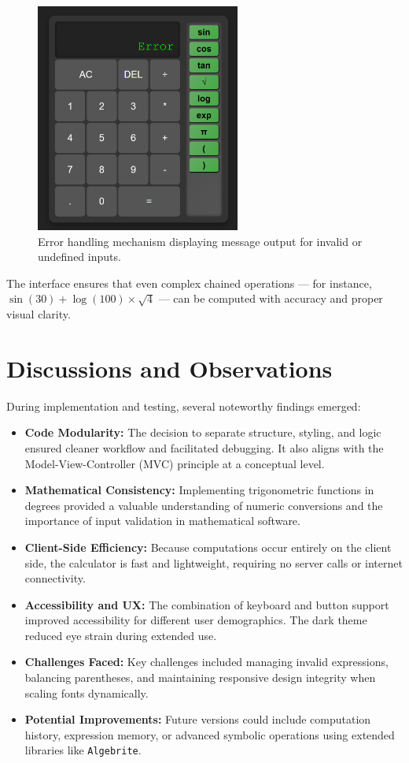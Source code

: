 \documentclass[a4paper,12pt,oneside]{report}
\numberwithin{equation}{chapter}
\numberwithin{figure}{chapter}
\numberwithin{table}{chapter}
\begin{document}
\begin{figure}[H]
    \centering
    \includegraphics[width=0.6\textwidth]{error_calc.png}
    \caption{Error handling mechanism displaying message output for invalid or undefined inputs.}
    \label{fig:CalculatorError}
\end{figure}

The interface ensures that even complex chained operations — for instance, $\sin(30) + \log(100) \times \sqrt{4}$ — can be computed with accuracy and proper visual clarity.

\section{Discussions and Observations}

During implementation and testing, several noteworthy findings emerged:
\begin{itemize}
    \item \textbf{Code Modularity:} The decision to separate structure, styling, and logic ensured cleaner workflow and facilitated debugging. It also aligns with the Model-View-Controller (MVC) principle at a conceptual level.
    \item \textbf{Mathematical Consistency:} Implementing trigonometric functions in degrees provided a valuable understanding of numeric conversions and the importance of input validation in mathematical software.
    \item \textbf{Client-Side Efficiency:} Because computations occur entirely on the client side, the calculator is fast and lightweight, requiring no server calls or internet connectivity.
    \item \textbf{Accessibility and UX:} The combination of keyboard and button support improved accessibility for different user demographics. The dark theme reduced eye strain during extended use.
    \item \textbf{Challenges Faced:} Key challenges included managing invalid expressions, balancing parentheses, and maintaining responsive design integrity when scaling fonts dynamically.
    \item \textbf{Potential Improvements:} Future versions could include computation history, expression memory, or advanced symbolic operations using extended libraries like \texttt{Algebrite}.
\end{itemize}
\end{document}
